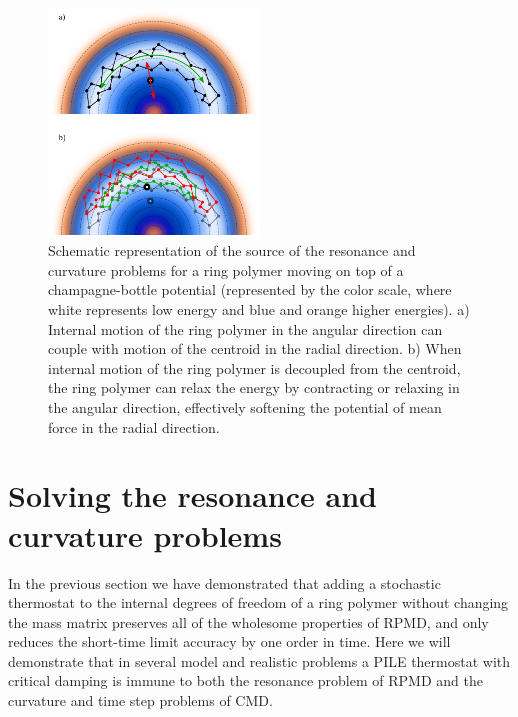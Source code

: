 \documentclass[aps,prb,superscriptaddress,amsmath,amssymb,showpacs,twocolumn]{revtex4}
\begin{document}
\begin{figure}[htbp]
\centering
\includegraphics[width=0.5\textwidth]{figures/champagne.pdf}
\caption{Schematic representation of the source of the resonance and curvature problems for a ring polymer 
moving on top of a champagne-bottle potential (represented by the color scale, where white represents low energy and blue 
and orange higher energies). a) Internal motion of the ring polymer in the angular direction can couple with motion 
of the centroid in the radial direction. b) When internal motion of the ring polymer is decoupled from the centroid, 
the ring polymer can relax the energy by contracting or relaxing in the angular direction, effectively softening the
potential of mean force in the radial direction. }
\label{fig:champagne}
\end{figure}

\section{Solving the resonance and curvature problems}

In the previous section we have demonstrated that adding a stochastic thermostat to the internal degrees of freedom
of a ring polymer without changing the mass matrix preserves all of the wholesome properties of RPMD, and only reduces
the short-time limit accuracy by one order in time. 
Here we will demonstrate that in several model and realistic problems a PILE thermostat with critical damping 
is immune to both the resonance problem of RPMD and the curvature and time step problems of CMD.


\end{document}

